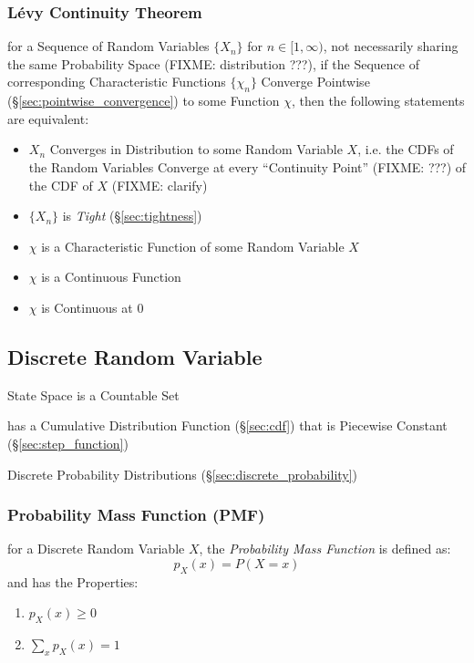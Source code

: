 \subsubsection{L\'evy Continuity Theorem}\label{sec:levy_continuity}

for a Sequence of Random Variables $\{ X_n \}$ for $n \in [1, \infty)$, not
necessarily sharing the same Probability Space (FIXME: distribution ???), if the
Sequence of corresponding Characteristic Functions $\{ \chi_n \}$ Converge
Pointwise (\S\ref{sec:pointwise_convergence}) to some Function $\chi$, then the
following statements are equivalent:

\begin{itemize}
  \item $X_n$ Converges in Distribution to some Random Variable $X$, i.e. the
    CDFs of the Random Variables Converge at every ``Continuity Point'' (FIXME:
    ???) of the CDF of $X$ (FIXME: clarify)
  \item $\{ X_n \}$ is \emph{Tight} (\S\ref{sec:tightness})
  \item $\chi$ is a Characteristic Function of some Random Variable $X$
  \item $\chi$ is a Continuous Function
  \item $\chi$ is Continuous at $0$
\end{itemize}



\subsection{Discrete Random Variable}\label{sec:discrete_random_variable}

State Space is a Countable Set

has a Cumulative Distribution Function (\S\ref{sec:cdf}) that is Piecewise
Constant (\S\ref{sec:step_function})

\fist Discrete Probability Distributions (\S\ref{sec:discrete_probability})



\subsubsection{Probability Mass Function (PMF)}\label{sec:pmf}

for a Discrete Random Variable $X$, the \emph{Probability Mass Function} is
defined as:
\[
  p_X(x) = P(X = x)
\]
and has the Properties:
\begin{enumerate}
  \item $p_X(x) \geq 0$
  \item $\sum_x p_X(x) = 1$
\end{enumerate}

